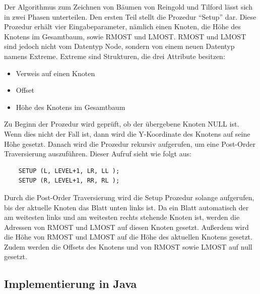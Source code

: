 Der Algorithmus zum Zeichnen von Bäumen von Reingold und Tilford lässt sich in zwei Phasen unterteilen.
Den ersten Teil stellt die Prozedur “Setup” dar. Diese Prozedur erhält vier Eingabeparameter, nämlich einen Knoten, 
die Höhe des Knotens im Gesamtbaum, sowie RMOST und LMOST. RMOST und LMOST sind jedoch nicht vom Datentyp Node, sondern 
von einem neuen Datentyp namens Extreme. Extreme sind Strukturen, die drei Attribute besitzen: 
\begin{itemize}
    \item Verweis auf einen Knoten
    \item Offset  
    \item Höhe des Knotens im Gesamtbaum
\end{itemize}

Zu Beginn der Prozedur wird geprüft, ob der übergebene Knoten NULL ist. Wenn dies nicht der Fall ist, 
dann wird die Y-Koordinate des Knotens auf seine Höhe gesetzt. Danach wird die Prozedur rekursiv aufgerufen, 
um eine Post-Order Traversierung auszuführen. Dieser Aufruf sieht wie folgt aus:

\begin{lstlisting}
    SETUP (L, LEVEL+1, LR, LL );
    SETUP (R, LEVEL+1, RR, RL );
\end{lstlisting}

Durch die Post-Order Traversierung wird die Setup Prozedur solange aufgerufen, bis der aktuelle Knoten das Blatt unten links ist. 
Da ein Blatt automatisch der am weitesten links und am weitesten rechts stehende Knoten ist, werden die Adressen von 
RMOST und LMOST auf diesen Knoten gesetzt. Außerdem wird die Höhe von RMOST und LMOST auf die Höhe des aktuellen Knotens gesetzt. 
Zudem werden die Offsets des Knotens und von RMOST sowie LMOST auf null gesetzt. 

\subsection{Implementierung in Java}

